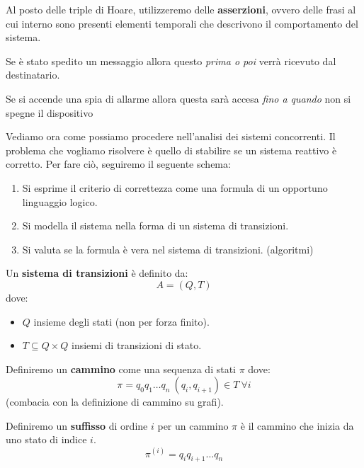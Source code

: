 Al posto delle triple di Hoare, utilizzeremo delle \textbf{asserzioni}, ovvero
delle frasi al cui interno sono presenti elementi temporali che descrivono il
comportamento del sistema.
\begin{esempio}
    Se è stato spedito un messaggio allora questo \textit{prima o poi} verrà
    ricevuto dal destinatario.
\end{esempio}
\begin{esempio}
    Se si accende una spia di allarme allora questa sarà accesa \textit{fino a
        quando} non si spegne il dispositivo
\end{esempio}
Vediamo ora come possiamo procedere nell'analisi dei sistemi concorrenti. Il
problema che vogliamo risolvere è quello di stabilire se un sistema reattivo è
corretto. Per fare ciò, seguiremo il seguente schema:
\begin{enumerate}
    \item Si esprime il criterio di correttezza come una formula di un opportuno
          linguaggio logico.
    \item Si modella il sistema nella forma di un sistema di transizioni.
    \item Si valuta se la formula è vera nel sistema di transizioni. (algoritmi)
\end{enumerate}
\begin{definizione}
    Un \textbf{sistema di transizioni} è definito da:
    \begin{equation}
        A=(Q,T)
    \end{equation}
    dove:
    \begin{itemize}
        \item $Q$ insieme degli stati (non per forza finito).
        \item $T \subseteq Q \times Q$ insiemi di transizioni di stato.
    \end{itemize}
\end{definizione}
\begin{definizione}
    Definiremo un \textbf{cammino} come una sequenza di stati $\pi$ dove:
    \begin{equation}
        \pi = q_0q_1\dots q_n \ (q_i,q_{i+1})\in T \ \forall i
    \end{equation}
    (combacia con la definizione di cammino su grafi).
\end{definizione}
\begin{definizione}
    Definiremo un \textbf{suffisso} di ordine $i$ per un cammino $\pi$ è il
    cammino che inizia da uno stato di indice $i$.
    \begin{equation}
        \pi^{(i)} = q_iq_{i+1}\dots q_n
    \end{equation}
\end{definizione}
